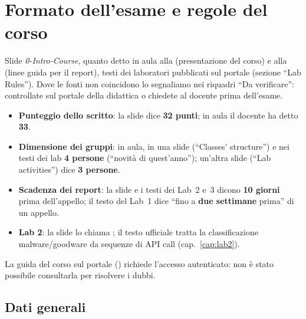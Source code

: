 \chapter{Formato dell'esame e regole del corso}
\label{cap:formato}

\begin{nota}[Fonti]
Slide \emph{0-Intro-Course}, quanto detto in aula alla  (presentazione del
corso) e alla  (linee guida per il report), testi dei laboratori pubblicati
sul portale (sezione ``Lab Rules''). Dove le fonti non coincidono lo segnaliamo nei riquadri
``Da verificare'': controllate sul portale della didattica o chiedete al docente prima dell'esame.
\end{nota}

\begin{verifica}
\begin{itemize}
  \item \textbf{Punteggio dello scritto}: la slide dice \textbf{32 punti}; in aula il docente ha
        detto \textbf{33}.
  \item \textbf{Dimensione dei gruppi}: in aula, in una slide (``Classes' structure'') e nei testi dei
        lab \textbf{4 persone} (``novità di quest'anno''); un'altra slide (``Lab activities'') dice
        \textbf{3 persone}.
  \item \textbf{Scadenza dei report}: la slide e i testi dei Lab~2 e~3 dicono \textbf{10 giorni} prima
        dell'appello; il testo del Lab~1 dice ``fino a \textbf{due settimane} prima'' di un appello.
  \item \textbf{Lab 2}: la slide lo chiama ; il testo ufficiale
        tratta la classificazione malware/goodware da sequenze di API call (cap.~\ref{cap:lab2}).
\end{itemize}
La guida del corso sul portale () richiede l'accesso autenticato: non è
stato possibile consultarla per risolvere i dubbi.
\end{verifica}

\section{Dati generali}

